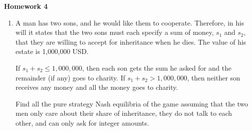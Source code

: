 \documentclass[12pt]{article}
\begin{document}
\begin{center}
{\Large \bf Homework 4
\\ \vskip5mm }
\end{center}

\vskip5mm 

\begin{enumerate}

\item 
A man has two sons, and he would like them to cooperate. Therefore, in his will it states that the two sons must each specify a sum of money, $s_1$ and $s_2$, that they are willing to accept for inheritance when he dies. The value of his estate is 1,000,000 USD.

If $s_1 + s_2 \leq 1,000,000$, then each son gets the sum he asked for and the remainder (if any) goes to charity. If $s_1 + s_2 > 1,000,000$, then neither son receives any money and all the money goes to charity.

Find all the pure strategy Nash equilibria of the game assuming that the two men only care about their share of inheritance, they do not talk to each other, and can only ask for integer amounts.


\end{enumerate}
\end{document}
